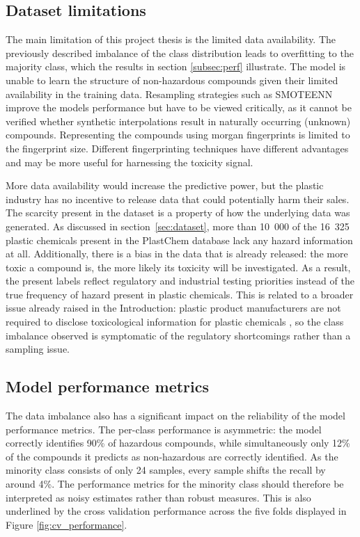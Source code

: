 \documentclass[hidelinks,11pt]{article}
\begin{document}
\subsection{Dataset limitations}
The main limitation of this project thesis is the limited data availability.
The previously described imbalance of the class distribution leads to overfitting to the majority class,
which the results in section \ref{subsec:perf} illustrate.
The model is unable to learn the structure of non-hazardous compounds given their limited availability
in the training data.
Resampling strategies such as SMOTEENN improve the models performance but have to be viewed critically,
as it cannot be verified whether synthetic interpolations result in naturally occurring (unknown) compounds.
Representing the compounds using morgan fingerprints is limited to the fingerprint size.
Different fingerprinting techniques have different advantages and may be more useful for harnessing the toxicity signal.

More data availability would increase the predictive power, but the plastic industry has no incentive to release
data that could potentially harm their sales.
The scarcity present in the dataset is a property of how the underlying data was generated.
As discussed in section~\ref{sec:dataset}, more than 10~000 of the 16~325 plastic chemicals present in
the PlastChem database lack any hazard information at all.
Additionally, there is a bias in the data that is already released: the more toxic a compound is, the more likely its 
toxicity will be investigated.
As a result, the present labels reflect regulatory and industrial testing priorities instead of 
the true frequency of hazard present in plastic chemicals.
This is related to a broader issue already raised in the Introduction: plastic product manufacturers are not
required to disclose toxicological information for plastic chemicals \parencite{geuekeFPFDossierNonintentionally2018},
so the class imbalance observed is symptomatic of the regulatory shortcomings rather than a sampling issue.


\subsection{Model performance metrics}
The data imbalance also has a significant impact on the reliability of the model performance metrics.
The per-class performance is asymmetric: the model correctly identifies 90\% of hazardous compounds, while 
simultaneously only 12\% of the compounds it predicts as non-hazardous are correctly identified.
As the minority class consists of only 24 samples, every sample shifts the recall by around 4\%. %
The performance metrics for the minority class should therefore be interpreted as noisy estimates 
rather than robust measures. This is also underlined by the cross validation performance across the five folds
displayed in Figure \ref{fig:cv_performance}.
\end{document}
